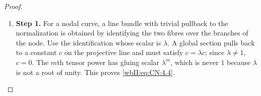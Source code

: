 \begin{proof}
\begin{enumerate}[label={$\langle1\rangle$\arabic*.},leftmargin=*]
\item 
\noindent\textbf{Step 1.} For a nodal curve, a line bundle with trivial pullback to the normalization
is obtained by identifying the two fibres over the branches of the node.
Use the identification whose scalar is $\lambda$.  A global section pulls
back to a constant $c$ on the projective line and must satisfy
$c=\lambda c$; since $\lambda\ne1$, $c=0$.  The $m$th tensor power has
gluing scalar $\lambda^m$, which is never $1$ because $\lambda$ is not a
root of unity.  This proves \eqref{wbII:eq:CN:4.4}.

\end{enumerate}
\end{proof}
